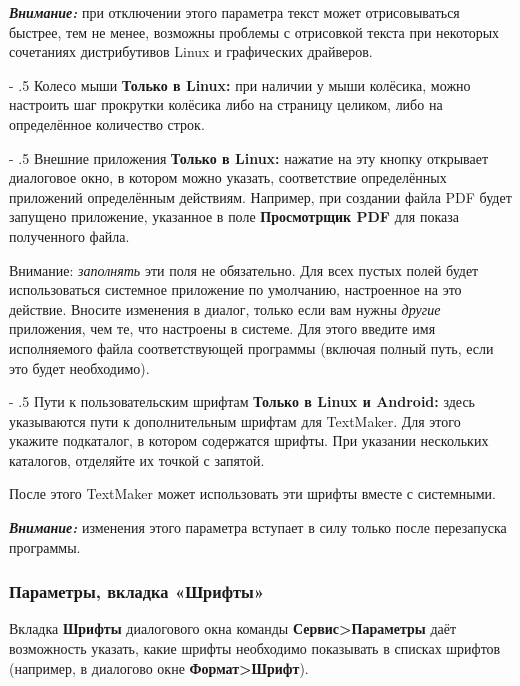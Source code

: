 ﻿\documentclass[a4paper,10pt]{article}
\makeatletter
\renewcommand\paragraph{%
   \@startsection{paragraph}{4}{0mm}%
      {-\baselineskip}%
      {.5\baselineskip}%
      {\normalfont\normalsize\bfseries}}
\makeatother
\begin{document}
  \textbf{\textit{Внимание:}} при отключении этого параметра текст может отрисовываться быстрее, тем не менее, возможны проблемы с отрисовкой текста при некоторых сочетаниях дистрибутивов Linux и графических драйверов.
  
  \paragraph{Колесо мыши}
  \textbf{Только в Linux:} при наличии у мыши колёсика, можно настроить шаг прокрутки колёсика либо на страницу целиком, либо на определённое количество строк.
  
 \paragraph{Внешние приложения}
 \textbf{Только в Linux:} нажатие на эту кнопку открывает диалоговое окно, в котором можно указать, соответствие определённых приложений определённым действиям. Например, при создании файла PDF будет запущено приложение, указанное в поле \textbf{Просмотрщик PDF} для показа полученного файла.
 
 Внимание: \textit{заполнять} эти поля не обязательно. Для всех пустых полей будет использоваться системное приложение по умолчанию, настроенное на это действие. Вносите изменения в диалог, только если вам нужны \textit{другие} приложения, чем те, что настроены в системе. Для этого введите имя исполняемого файла соответствующей программы (включая полный путь, если это будет необходимо).
 
 \paragraph{Пути к пользовательским шрифтам}
\textbf{Только в Linux и Android:} здесь указываются пути к дополнительным шрифтам для TextMaker. Для этого укажите подкаталог, в котором содержатся шрифты. При указании нескольких каталогов, отделяйте их точкой с запятой.

После этого TextMaker может использовать эти шрифты вместе с системными.

\textit{\textbf{Внимание:}} изменения этого параметра вступает в силу только после перезапуска программы.
 
 \subsubsection{Параметры, вкладка «Шрифты»}
 Вкладка \textbf{Шрифты} диалогового окна команды \textbf{Сервис>Параметры} даёт возможность указать, какие шрифты необходимо показывать в списках шрифтов (например, в диалогово окне \textbf{Формат>Шрифт}).
 
\end{document}
